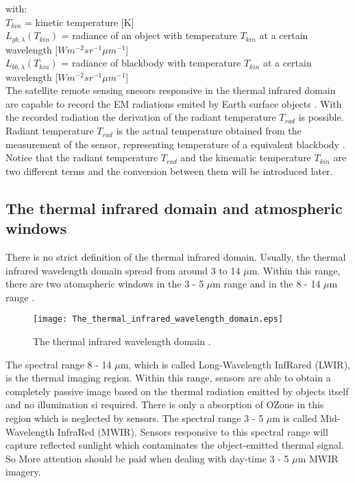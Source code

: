 \noindent with:\\
\indent $T_{kin}$ = kinetic temperature [K]\\
\indent $L_{gb, \lambda}(T_{kin})$ = radiance of an object with temperature $T_{kin}$ at a certain wavelength [$W m^{-2} sr^{-1} \mu m^{-1}$]\\
\indent $L_{bb, \lambda}(T_{kin})$ = radiance of blackbody with temperature $T_{kin}$ at a certain wavelength [$W m^{-2} sr^{-1} \mu m^{-1}$]\\

\noindent The satellite remote sensing snesors responsive in the thermal infrared domain are capable to record the EM radiations emited by Earth surface objects \parencite{Reference204}. With the recorded radiation the derivation of the radiant temperature $T_{rad}$ is possible. Radiant temperature $T_{rad}$ is the actual temperature obtained from the measurement of the sensor, representing temperature of a equivalent blackbody \parencite{Reference206}. Notice that the radiant temperature $T_{rad}$ and the kinematic temperature $T_{kin}$ are two different terms and the conversion between them will be introduced later.\\


\subsection{The thermal infrared domain and atmospheric windows}
There is no strict definition of the thermal infrared domain. Usually, the thermal infrared wavelength domain spread from around 3 to 14 $\mu$m. Within this range, there are two atomspheric windows in the 3 - 5 $\mu$m range and in the 8 - 14 $\mu$m range \parencite{Reference204}. \\

\begin{figure}[!htbp]
  \centering\texttt{[image: The\_thermal\_infrared\_wavelength\_domain.eps]}
  \caption{The thermal infrared wavelength domain \parencite{Reference204}.}
  \label{fig:TIRdomain}
\end{figure}

\noindent The spectral range 8 - 14 $\mu$m, which is called Long-Wavelength InfRared (LWIR), is the thermal imaging region. Within this range, sensors are able to obtain a completely passive image based on the thermal radiation emitted by objects itself and no illumination si required. There is only a absorption of OZone in this region which is neglected by sensors. The spectral range 3 - 5 $\mu$m is called Mid-Wavelength InfraRed (MWIR). Sensors responsive to this spectral range will capture reflected sunlight which contaminates the object-emitted thermal signal. So More attention should be paid when dealing with day-time 3 - 5 $\mu$m MWIR imagery. \\

